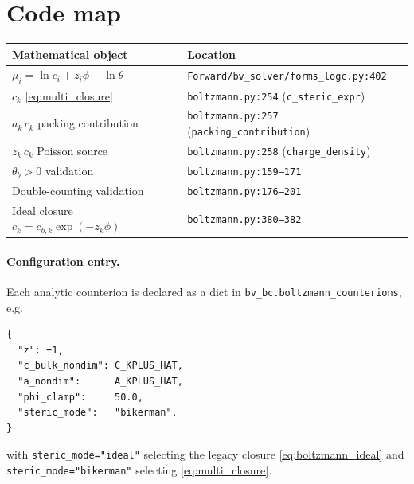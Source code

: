 \documentclass[11pt]{article}
\begin{document}
\section{Code map}

\begin{center}
\begin{tabular}{ll}
\toprule
Mathematical object & Location \\
\midrule
$\mu_i = \ln c_i + z_i\phi - \ln\theta$
   & \texttt{Forward/bv\_solver/forms\_logc.py:402} \\
$c_k$ \eqref{eq:multi_closure}
   & \texttt{boltzmann.py:254} (\texttt{c\_steric\_expr}) \\
$a_k\,c_k$ packing contribution
   & \texttt{boltzmann.py:257} (\texttt{packing\_contribution}) \\
$z_k\,c_k$ Poisson source
   & \texttt{boltzmann.py:258} (\texttt{charge\_density}) \\
$\theta_b > 0$ validation
   & \texttt{boltzmann.py:159--171} \\
Double-counting validation
   & \texttt{boltzmann.py:176--201} \\
Ideal closure $c_k = c_{b,k}\exp(-z_k\phi)$
   & \texttt{boltzmann.py:380--382} \\
\bottomrule
\end{tabular}
\end{center}

\paragraph{Configuration entry.}
Each analytic counterion is declared as a dict in
\texttt{bv\_bc.boltzmann\_counterions}, e.g.\
\begin{verbatim}
{
  "z": +1,
  "c_bulk_nondim": C_KPLUS_HAT,
  "a_nondim":      A_KPLUS_HAT,
  "phi_clamp":     50.0,
  "steric_mode":   "bikerman",
}
\end{verbatim}
with \texttt{steric\_mode="ideal"} selecting the legacy closure
\eqref{eq:boltzmann_ideal} and \texttt{steric\_mode="bikerman"}
selecting \eqref{eq:multi_closure}.
\end{document}
